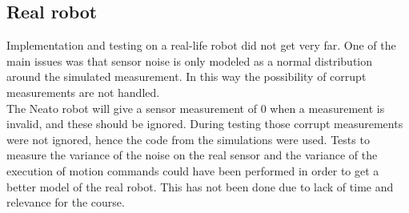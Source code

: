 \subsection{Real robot}
Implementation and testing on a real-life robot did not get very far.
One of the main issues was that sensor noise is only modeled as a normal distribution around the simulated measurement. In this way the possibility of corrupt measurements are not handled.\\

The Neato robot will give a sensor measurement of 0 when a measurement is invalid, and these should be ignored. During testing those corrupt measurements were not ignored, hence the code from the simulations were used. Tests to measure the variance of the noise on the real sensor and the variance of the execution of motion commands could have been performed in order to get a better model of the real robot. This has not been done due to lack of time and relevance for the course.
